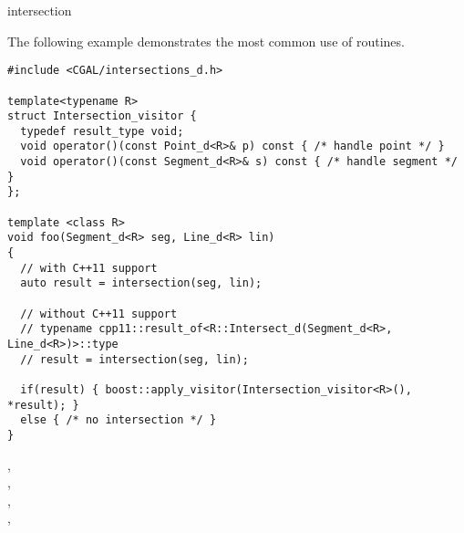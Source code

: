 \begin{ccRefFunction}{intersection}
\ccExample

The following example demonstrates the most common use of 
 routines.
\ccHtmlLinksOff%
\begin{verbatim}
#include <CGAL/intersections_d.h>

template<typename R>
struct Intersection_visitor {
  typedef result_type void;
  void operator()(const Point_d<R>& p) const { /* handle point */ }
  void operator()(const Segment_d<R>& s) const { /* handle segment */ }
};

template <class R>
void foo(Segment_d<R> seg, Line_d<R> lin)
{
  // with C++11 support
  auto result = intersection(seg, lin);

  // without C++11 support
  // typename cpp11::result_of<R::Intersect_d(Segment_d<R>, Line_d<R>)>::type
  // result = intersection(seg, lin);

  if(result) { boost::apply_visitor(Intersection_visitor<R>(), *result); } 
  else { /* no intersection */ }
}
\end{verbatim}%
\ccHtmlLinksOn%

\ccSeeAlso 
{}, \\
, \\
, \\ 
, \\
 \\

\end{ccRefFunction}

